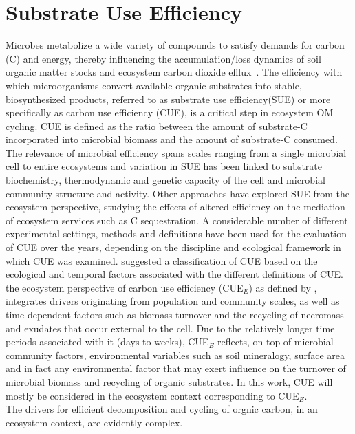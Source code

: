 \documentclass[12pt]{report}
\begin{document}
\section{Substrate Use Efficiency }
	
	Microbes metabolize a wide variety of compounds to satisfy demands for carbon (C) and energy, thereby influencing the accumulation/loss dynamics of soil organic matter stocks and ecosystem carbon dioxide efflux . The efficiency with which microorganisms convert available organic substrates into stable, biosynthesized products,   referred to as substrate use efficiency(SUE) or more specifically as carbon use efficiency (CUE), is a critical step in ecosystem OM cycling. CUE is defined as the ratio between the amount of substrate-C incorporated into microbial biomass and the amount of substrate-C consumed. The relevance of microbial efficiency spans scales ranging from a single microbial cell to entire ecosystems and variation in SUE has been linked to substrate biochemistry, thermodynamic and genetic capacity of the cell and microbial community structure and activity\citep{kallenbach2019, soares2019}. Other approaches have explored SUE from the ecosystem perspective, studying the effects of altered efficiency on the mediation of ecosystem services such as C sequestration. A considerable number of different experimental settings, methods and definitions have been used for the evaluation of CUE over the years, depending on the discipline and ecological framework in which CUE was examined. \citet{geyer2016} suggested a classification of CUE based on the ecological and temporal factors associated with the different definitions of CUE. the ecosystem perspective of carbon use efficiency (CUE$ _E $) as defined by \citeauthor{geyer2016}, integrates drivers originating from population and community scales, as well as time-dependent factors such as biomass turnover and the recycling of necromass and exudates that occur external to the cell. Due to the relatively longer time periods associated with it (days to weeks), CUE$ _E $ reflects, on top of microbial community factors, environmental variables such as soil mineralogy, surface area and in fact any environmental factor that may exert influence on the turnover of microbial biomass and recycling of organic substrates. In this work, CUE will mostly be considered in the ecosystem context corresponding to CUE$ _E $.\\   
	The drivers for efficient decomposition and cycling of orgnic carbon, in an ecosystem context, are evidently complex. 
\end{document}
